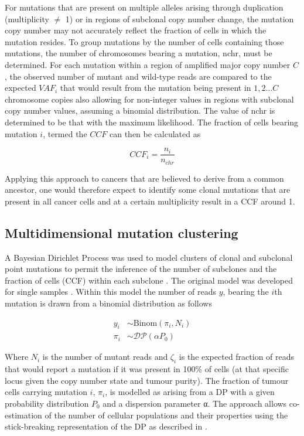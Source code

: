 For mutations that are present on multiple alleles arising through duplication (multiplicity $\neq$ 1) or in regions of subclonal copy number change, the mutation copy number may not accurately reflect the fraction of cells in which the mutation resides. To group mutations by the number of cells containing those mutations, the number of chromosomes bearing a mutation, nchr, must be determined. For each mutation within a region of amplified major copy number $C$, the observed number of mutant and wild-type reads are compared to the expected $VAF_i$ that would result from the mutation being present in $1, 2 \ldots C$ chromosome copies also allowing for non-integer values in regions with subclonal copy number values, assuming a binomial distribution. The value of nchr is determined to be that with the maximum likelihood. The fraction of cells bearing mutation $i$, termed the $CCF$ can then be calculated as 

\begin{equation}
    CCF_i = \frac{n_i}{n_{chr}}
\end{equation}

Applying this approach to cancers that are believed to derive from a common ancestor, one would therefore expect to identify some clonal mutations that are present in all cancer cells and at a certain multiplicity result in a \ac{CCF} around 1. 

\subsection{Multidimensional mutation clustering}

A Bayesian Dirichlet Process was used to model clusters of clonal and subclonal point mutations to permit the inference of the number of subclones and the fraction of cells (\ac{CCF}) within each subclone . The original model was developed for single samples \parencite{Nik-Zainal2012-zz}. Within this model the number of reads $y$, bearing the $i$th mutation is drawn from a binomial distribution as follows

\begin{align}
    y_i &\sim \text{Binom}(\pi_i,N_i)\\
    \pi_i &\sim \mathcal{DP}(\alpha P_0) 
\end{align}

Where $N_i$ is the number of mutant reads and $\zeta_i$ is the expected fraction of reads that would report a mutation if it was present in 100\% of cells (at that specific locus given the copy number state and tumour purity). The fraction of tumour cells carrying mutation $i$, $\pi_i$, is modelled as arising from a \acf{DP} with a given probability distribution $P_0$ and a dispersion parameter α. The approach allows co-estimation of the number of cellular populations and their properties using the stick-breaking representation of the \ac{DP} as described in \textcite{Dentro2017-jb}.

